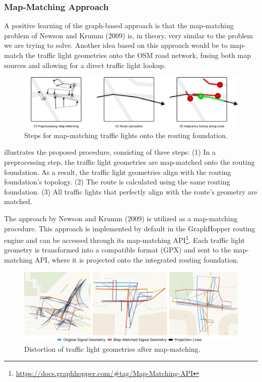 \subsubsection{Map-Matching Approach}

A positive learning of the graph-based approach is that the map-matching problem of Newson and Krumm (2009) \cite{newson_hidden_2009} is, in theory, very similar to the problem we are trying to solve. Another idea based on this approach would be to map-match the traffic light geometries onto the OSM road network, fusing both map sources and allowing for a direct traffic light lookup.

\begin{figure}[htbp]
\centering
\includegraphics[width=\linewidth]{images/sg-selection-map-matching-approach.pdf}
\caption{Steps for map-matching traffic lights onto the routing foundation.}
\label{fig:sg-selection-map-matching-approach}
\end{figure}

 illustrates the proposed procedure, consisting of three steps: (1) In a preprocessing step, the traffic light geometries are map-matched onto the routing foundation. As a result, the traffic light geometries align with the routing foundation's topology. (2) The route is calculated using the same routing foundation. (3) All traffic lights that perfectly align with the route's geometry are matched.

The approach by Newson and Krumm (2009) \cite{newson_hidden_2009} is utilized as a map-matching procedure. This approach is implemented by default in the GraphHopper routing engine and can be accessed through its map-matching API\footnote{\url{https://docs.graphhopper.com/\#tag/Map-Matching-API}}. Each traffic light geometry is transformed into a compatible format (GPX) and sent to the map-matching API, where it is projected onto the integrated routing foundation.

\begin{figure}[htbp]
\centering
\includegraphics[width=\linewidth]{images/sg-selection-map-matching-fails.png}
\caption{Distortion of traffic light geometries after map-matching.}
\label{fig:sg-selection-map-matching-fails}
\end{figure}

